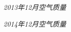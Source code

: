 ﻿\documentclass{article}
\begin{document}
\begin{CJK*}{GBK}{song}
\begin{figure}[ht]
\centering
{}
\caption{\textit{2013年12月空气质量}}
\end{figure}

\begin{figure}[ht]
\centering
{}
\caption{\textit{2014年12月空气质量}}
\end{figure}

\end{CJK*}
\end{document}
